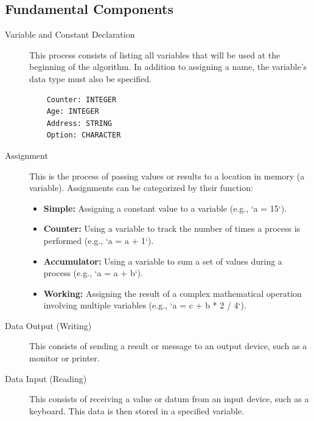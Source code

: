 \subsection{Fundamental Components}
\begin{description}
    \item[Variable and Constant Declaration] This process consists of listing all variables that will be used at the beginning of the algorithm. In addition to assigning a name, the variable's data type must also be specified.
    \begin{verbatim}
    Counter: INTEGER
    Age: INTEGER
    Address: STRING
    Option: CHARACTER
    \end{verbatim}
    
    \item[Assignment] This is the process of passing values or results to a location in memory (a variable). Assignments can be categorized by their function:
    \begin{itemize}
        \item \textbf{Simple:} Assigning a constant value to a variable (e.g., `a = 15`).
        \item \textbf{Counter:} Using a variable to track the number of times a process is performed (e.g., `a = a + 1`).
        \item \textbf{Accumulator:} Using a variable to sum a set of values during a process (e.g., `a = a + b`).
        \item \textbf{Working:} Assigning the result of a complex mathematical operation involving multiple variables (e.g., `a = c + b * 2 / 4`).
    \end{itemize}
    
    \item[Data Output (Writing)] This consists of sending a result or message to an output device, such as a monitor or printer.
    
    \item[Data Input (Reading)] This consists of receiving a value or datum from an input device, such as a keyboard. This data is then stored in a specified variable.
\end{description}


